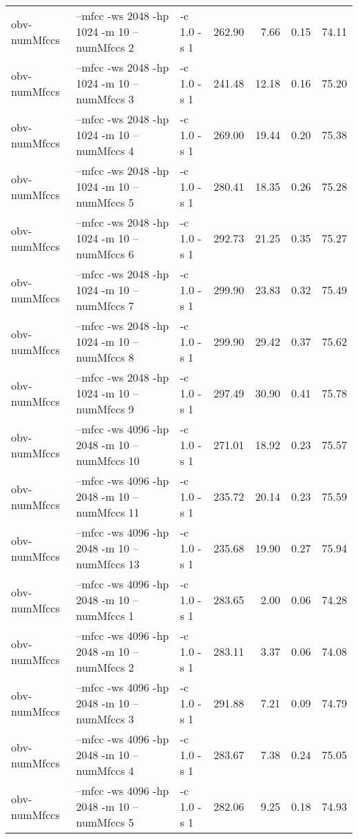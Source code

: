 \documentclass[11pt,a4paper]{article}
\begin{document}
\begin{tabular}{lllrrrr}
 obv-numMfccs  &  --mfcc -ws 2048 -hp 1024 -m 10 --numMfccs 2    &  -c 1.0 -s 1  &  262.90  &     7.66  &   0.15  &  74.11  \\
 obv-numMfccs  &  --mfcc -ws 2048 -hp 1024 -m 10 --numMfccs 3    &  -c 1.0 -s 1  &  241.48  &    12.18  &   0.16  &  75.20  \\
 obv-numMfccs  &  --mfcc -ws 2048 -hp 1024 -m 10 --numMfccs 4    &  -c 1.0 -s 1  &  269.00  &    19.44  &   0.20  &  75.38  \\
 obv-numMfccs  &  --mfcc -ws 2048 -hp 1024 -m 10 --numMfccs 5    &  -c 1.0 -s 1  &  280.41  &    18.35  &   0.26  &  75.28  \\
 obv-numMfccs  &  --mfcc -ws 2048 -hp 1024 -m 10 --numMfccs 6    &  -c 1.0 -s 1  &  292.73  &    21.25  &   0.35  &  75.27  \\
 obv-numMfccs  &  --mfcc -ws 2048 -hp 1024 -m 10 --numMfccs 7    &  -c 1.0 -s 1  &  299.90  &    23.83  &   0.32  &  75.49  \\
 obv-numMfccs  &  --mfcc -ws 2048 -hp 1024 -m 10 --numMfccs 8    &  -c 1.0 -s 1  &  299.90  &    29.42  &   0.37  &  75.62  \\
 obv-numMfccs  &  --mfcc -ws 2048 -hp 1024 -m 10 --numMfccs 9    &  -c 1.0 -s 1  &  297.49  &    30.90  &   0.41  &  75.78  \\
 obv-numMfccs  &  --mfcc -ws 4096 -hp 2048 -m 10 --numMfccs 10   &  -c 1.0 -s 1  &  271.01  &    18.92  &   0.23  &  75.57  \\
 obv-numMfccs  &  --mfcc -ws 4096 -hp 2048 -m 10 --numMfccs 11   &  -c 1.0 -s 1  &  235.72  &    20.14  &   0.23  &  75.59  \\
 obv-numMfccs  &  --mfcc -ws 4096 -hp 2048 -m 10 --numMfccs 13   &  -c 1.0 -s 1  &  235.68  &    19.90  &   0.27  &  75.94  \\
 obv-numMfccs  &  --mfcc -ws 4096 -hp 2048 -m 10 --numMfccs 1    &  -c 1.0 -s 1  &  283.65  &     2.00  &   0.06  &  74.28  \\
 obv-numMfccs  &  --mfcc -ws 4096 -hp 2048 -m 10 --numMfccs 2    &  -c 1.0 -s 1  &  283.11  &     3.37  &   0.06  &  74.08  \\
 obv-numMfccs  &  --mfcc -ws 4096 -hp 2048 -m 10 --numMfccs 3    &  -c 1.0 -s 1  &  291.88  &     7.21  &   0.09  &  74.79  \\
 obv-numMfccs  &  --mfcc -ws 4096 -hp 2048 -m 10 --numMfccs 4    &  -c 1.0 -s 1  &  283.67  &     7.38  &   0.24  &  75.05  \\
 obv-numMfccs  &  --mfcc -ws 4096 -hp 2048 -m 10 --numMfccs 5    &  -c 1.0 -s 1  &  282.06  &     9.25  &   0.18  &  74.93  \\

\end{tabular}
\end{document}
